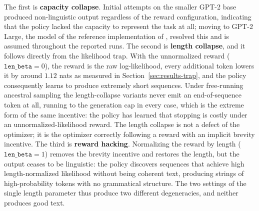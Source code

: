 The first is \textbf{capacity collapse}. Initial attempts on the smaller GPT-2 base produced non-linguistic output regardless of the reward configuration, indicating that the policy lacked the capacity to represent the task at all; moving to GPT-2 Large, the model of the reference implementation of \citet{hu2024amortizing}, resolved this and is assumed throughout the reported runs. The second is \textbf{length collapse}, and it follows directly from the likelihood trap. With the unnormalized reward ($\texttt{len\_beta}=0$), the reward is the raw log-likelihood, every additional token lowers it by around $1.12$ nats as measured in Section~\ref{sec:results-trap}, and the policy consequently learns to produce extremely short sequences.
Under free-running ancestral sampling the length-collapse variants never emit an end-of-sequence token at all, running to the generation cap in every case, which is the extreme form of the same incentive: the policy has learned that stopping is costly under an unnormalized-likelihood reward.
The length collapse is not a defect of the optimizer; it is the optimizer correctly following a reward with an implicit brevity incentive. The third is \textbf{reward hacking}. Normalizing the reward by length ($\texttt{len\_beta}=1$) removes the brevity incentive and restores the length, but the output ceases to be linguistic: the policy discovers sequences that achieve high length-normalized likelihood without being coherent text, producing strings of high-probability tokens with no grammatical structure.
The two settings of the single length parameter thus produce two different degeneracies, and neither produces good text.

